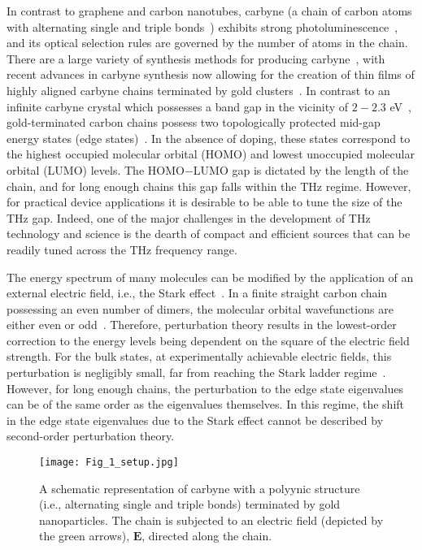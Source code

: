 \documentclass[
preprint,
 amsmath,amssymb,
 aps,
]{revtex4-2}
\begin{document}
In contrast to graphene and carbon nanotubes, carbyne (a chain of carbon atoms with alternating single and triple bonds~\cite{casari2016carbon, zhang2020review}) exhibits strong photoluminescence~\cite{pan2015carbyne}, and its optical selection rules are governed by the number of atoms in the chain. There are a large variety of synthesis methods for producing carbyne~\cite{johnson1972silylation, gibtner2002end, chalifoux2010synthesis, nishide2006single, shi2016confined, cataldo2004synthesis, pan2015carbyne, kutrovskaya2020excitonic}, with recent advances in carbyne synthesis now allowing for the creation of thin films of highly aligned carbyne chains terminated by gold clusters~\cite{portnoi2023polarization}. In contrast to an infinite carbyne crystal which possesses a band gap in the vicinity of $2-2.3$ eV~\cite{al2014electronic}, gold-terminated carbon chains possess two topologically protected mid-gap energy states (edge states)~\cite{hartmann2021terahertz}. In the absence of doping, these states correspond to the highest occupied molecular orbital (HOMO) and lowest unoccupied molecular orbital (LUMO) levels. The HOMO$-$LUMO gap is dictated by the length of the chain, and for long enough chains this gap falls within the THz regime. However, for practical device applications it is desirable to be able to tune the size of the THz gap.  Indeed, one of the major challenges in the development of THz technology and science is the dearth of compact and efficient sources that can be readily tuned across the THz frequency range.

The energy spectrum of many molecules can be modified by the application of an external electric field, i.e., the Stark effect~\cite{stark1914beobachtungen}. In a finite straight carbon chain possessing an even number of dimers, the molecular orbital wavefunctions are either even or odd~\cite{hartmann2021terahertz}. Therefore, perturbation theory results in the lowest-order correction to the energy levels being dependent on the square of the electric field strength. For the bulk states, at experimentally achievable electric fields, this perturbation is negligibly small, far from reaching the Stark ladder regime~\cite{wannier1960wave}. However, for long enough chains, the perturbation to the edge state eigenvalues can be of the same order as the eigenvalues themselves. In this regime, the shift in the edge state eigenvalues due to the Stark effect cannot be described by second-order perturbation theory. 

\begin{figure}
    \texttt{[image: Fig\_1\_setup.jpg]}
    \caption{A schematic representation of carbyne with a polyynic structure (i.e., alternating single and triple bonds) terminated by gold nanoparticles. The chain is subjected to an electric field (depicted by the green arrows), $\boldsymbol{E}$, directed along the chain.}
    \label{fig:exp_setup}
\end{figure}
\end{document}
